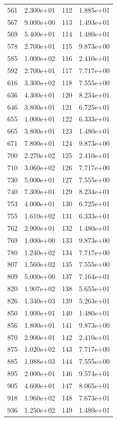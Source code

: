 \documentclass[12pt]{article}
\begin{document}
\begin{longtable}{@{}cccc@{}}
561 & 2.300e+01 & 112 & 1.885e+01 \\
567 & 9.000e+00 & 113 & 1.493e+01 \\
569 & 5.400e+01 & 114 & 1.480e+01 \\
578 & 2.700e+01 & 115 & 9.873e+00 \\
585 & 1.000e+02 & 116 & 2.410e+01 \\
592 & 2.700e+01 & 117 & 7.717e+00 \\
616 & 3.300e+02 & 118 & 7.555e+00 \\
636 & 4.300e+01 & 120 & 8.234e+01 \\
646 & 3.800e+01 & 121 & 6.725e+01 \\
655 & 1.000e+01 & 122 & 6.333e+01 \\
665 & 3.800e+01 & 123 & 1.480e+01 \\
671 & 7.800e+01 & 124 & 9.873e+00 \\
700 & 2.270e+02 & 125 & 2.410e+01 \\
710 & 3.060e+02 & 126 & 7.717e+00 \\
730 & 5.000e+01 & 127 & 7.555e+00 \\
740 & 7.300e+01 & 129 & 8.234e+01 \\
753 & 4.000e+01 & 130 & 6.725e+01 \\
755 & 1.610e+02 & 131 & 6.333e+01 \\
762 & 2.900e+01 & 132 & 1.480e+01 \\
769 & 1.000e+00 & 133 & 9.873e+00 \\
780 & 1.240e+02 & 134 & 7.717e+00 \\
807 & 1.560e+02 & 135 & 7.555e+00 \\
809 & 5.000e+00 & 137 & 7.164e+01 \\
820 & 1.907e+02 & 138 & 5.655e+01 \\
826 & 1.340e+03 & 139 & 5.263e+01 \\
850 & 1.000e+01 & 140 & 1.480e+01 \\
856 & 1.800e+01 & 141 & 9.873e+00 \\
870 & 2.900e+01 & 142 & 2.410e+01 \\
875 & 1.020e+02 & 143 & 7.717e+00 \\
885 & 1.088e+03 & 144 & 7.555e+00 \\
895 & 2.000e+01 & 146 & 9.574e+01 \\
905 & 4.600e+01 & 147 & 8.065e+01 \\
918 & 1.960e+02 & 148 & 7.673e+01 \\
936 & 1.250e+02 & 149 & 1.480e+01 \\

\end{longtable}
\end{document}
